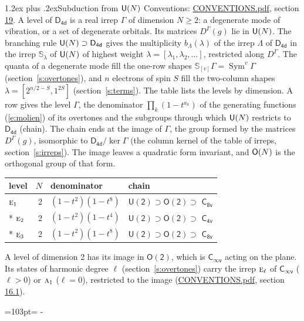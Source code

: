 \documentclass[10pt,a4paper]{article}
\makeatletter
\renewcommand\section{\@startsection{section}{1}{\z@}{-3ex plus -1ex minus -.2ex}%
  {1.2ex plus .2ex}{\normalfont\large\sffamily\bfseries\color{parttitle}}}
\newcommand{\needspace}[1]{\par\penalty-100\begingroup\dimen0=#1\relax\dimen2=\pagegoal
  \advance\dimen2-\pagetotal\ifdim\dimen0>\dimen2\relax\ifdim\dimen2>0pt\vfil\break\fi\fi
  \endgroup}
\numberwithin{equation}{section}
\newcommand{\grp}[1]{\mathsf{#1}}
\newcommand{\irr}[1]{\text{\normalfont\scshape #1}}
\newcommand{\repD}[1]{D^{#1}}
\newcommand{\schur}[1]{\mathbb{S}_{#1}}
\newcommand{\shape}[1]{[#1]}
\makeatother
\begin{document}
\section{Subduction from \texorpdfstring{$\grp{U(\mathnormal{N})}$}{U(N)}}\label{s:unitary}
Conventions: \href{../../CONVENTIONS.pdf}{CONVENTIONS.pdf}, section \href{../../CONVENTIONS.pdf\#conv.19}{19}.
\leavevmode\label{n:local.level.dimension}A level of $\grp{D_{4d}}$ is a real irrep $\Gamma$ of dimension $N \ge 2$: a degenerate mode of vibration, or a set of degenerate orbitals. \label{n:group.unitary}Its matrices $\repD{\Gamma}(g)$ lie in $\grp{U(\mathnormal{N})}$. \label{n:irrep.schur}\label{n:shape.partition}\label{n:local.partition}\label{n:function.multiplicity.unitary}The branching rule $\grp{U(\mathnormal{N})} \supset \grp{D_{4d}}$ gives the multiplicity $b_\Lambda(\lambda)$ of the irrep $\Lambda$ of $\grp{D_{4d}}$ in the irrep $\schur{\lambda}$ of $\grp{U(\mathnormal{N})}$ of highest weight $\lambda = \shape{\lambda_1, \lambda_2, \dots}$, restricted along $\repD{\Gamma}$. \label{n:local.partition.power}\label{n:local.electrons}\label{n:local.spin}The quanta of a degenerate mode fill the one-row shapes $\schur{\shape{v}}\Gamma = \operatorname{Sym}^{v}\Gamma$ (section~\ref{s:overtones}), and $n$ electrons of spin $S$ fill the two-column shapes $\lambda = \shape{2^{n/2-S}, 1^{2S}}$ (section~\ref{s:terms}).
The table lists the levels by dimension. \label{n:head.level}\label{n:head.denominator}\label{n:index.overtone.denominator}\label{n:head.chain}A row gives the level $\Gamma$, the denominator $\prod_k (1 - t^{a_k})$ of the generating functions (\ref{e:molien}) of its overtones and the subgroups through which $\grp{U(\mathnormal{N})}$ restricts to $\grp{D_{4d}}$ (chain). The chain ends at the image of $\Gamma$, the group formed by the matrices $\repD{\Gamma}(g)$, isomorphic to $\grp{D_{4d}}/\ker\Gamma$ (the column kernel of the table of irreps, section~\ref{s:irreps}). The image leaves a quadratic form invariant, and $\grp{O(\mathnormal{N})}$ is the orthogonal group of that form.
{\small\begin{longtable}{@{}lrll@{}}\toprule
level & $N$ & denominator & chain\\\midrule\endhead
\bottomrule\endfoot\endlastfoot
$\irr{e}_{1}$ & 2 & $(1-t^{2})(1-t^{8})$ & $\grp{U(2)} \supset \grp{O(2)} \supset$ \href{C8v.pdf}{$\grp{C_{8v}}$}\\*
$\irr{e}_{2}$ & 2 & $(1-t^{2})(1-t^{4})$ & $\grp{U(2)} \supset \grp{O(2)} \supset$ \href{C4v.pdf}{$\grp{C_{4v}}$}\\*
$\irr{e}_{3}$ & 2 & $(1-t^{2})(1-t^{8})$ & $\grp{U(2)} \supset \grp{O(2)} \supset$ \href{C8v.pdf}{$\grp{C_{8v}}$}\\
\bottomrule\end{longtable}}
A level of dimension 2 has its image in $\grp{O(2)}$, which is \href{Cinfv.pdf}{$\grp{C_{\infty v}}$} acting on the plane. \label{n:index.harmonic.degree}Its states of harmonic degree $\ell$ (section~\ref{s:overtones}) carry the irrep $\irr{e}_{\ell}$ of \href{Cinfv.pdf}{$\grp{C_{\infty v}}$} ($\ell > 0$) or $\irr{a}_{1}$ ($\ell = 0$), restricted to the image (\href{../../CONVENTIONS.pdf}{CONVENTIONS.pdf}, section \href{../../CONVENTIONS.pdf\#conv.16.1}{16.1}).
\needspace{103pt}
\end{document}
